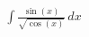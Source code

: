\documentclass[preview]{standalone}
\begin{document}
\begin{align*}
\int \frac{\sin(x)}{\sqrt{\cos(x)}} \, dx
\end{align*}
\end{document}
